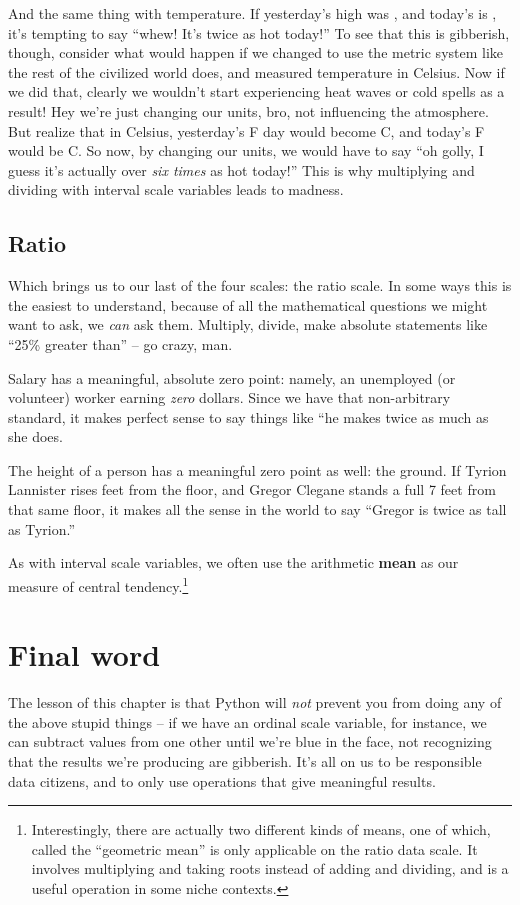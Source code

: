 And the same thing with temperature. If yesterday's high was , and
today's is , it's tempting to say ``whew! It's twice as hot today!''
To see that this is gibberish, though, consider what would happen if we changed
to use the metric system like the rest of the civilized world does, and
measured temperature in Celsius. Now if we did that, clearly we wouldn't start
experiencing heat waves or cold spells as a result! Hey we're just changing our
units, bro, not influencing the atmosphere. But realize that in Celsius,
yesterday's F day would become C, and today's
F would be C. So now, by changing our units, we would
have to say ``oh golly, I guess it's actually over \textit{six times} as hot
today!'' This is why multiplying and dividing with interval scale variables
leads to madness.


\subsection{Ratio}

Which brings us to our last of the four scales: the ratio scale. In some ways
this is the easiest to understand, because of all the mathematical questions
we might want to ask, we \textit{can} ask them. Multiply, divide, make 
absolute statements like ``25\% greater than'' -- go crazy, man.

Salary has a meaningful, absolute zero point: namely, an unemployed (or
volunteer) worker earning \textit{zero} dollars. Since we have that
non-arbitrary standard, it makes perfect sense to say things like ``he makes
twice as much as she does.

The height of a person has a meaningful zero point as well: the ground. If
Tyrion Lannister rises  feet from the floor, and Gregor Clegane
stands a full 7 feet from that same floor, it makes all the sense in the world
to say ``Gregor is twice as tall as Tyrion.''

As with interval scale variables, we often use the arithmetic \textbf{mean}  as
our measure of central tendency.\footnote{Interestingly, there are actually two
different kinds of means, one of which, called the ``geometric mean'' is only
applicable on the ratio data scale. It involves multiplying and taking roots
instead of adding and dividing, and is a useful operation in some niche
contexts.}

\section{Final word}
The lesson of this chapter is that Python will \textit{not} prevent you from
doing any of the above stupid things -- if we have an ordinal scale variable,
for instance, we can subtract values from one other until we're blue in the
face, not recognizing that the results we're producing are gibberish. It's all
on us to be responsible data citizens, and to only use operations that give
meaningful results.
